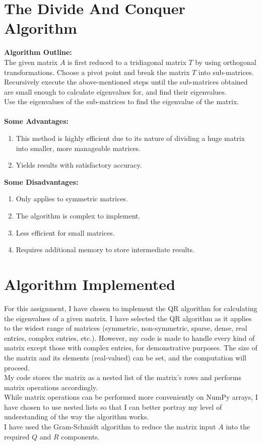 \documentclass[journal,12pt,twocolumn]{IEEEtran}
\theoremstyle{remark}
\begin{document}
\section{The Divide And Conquer Algorithm}
\textbf{Algorithm Outline:}
\\
The given matrix $A$ is first reduced to a tridiagonal matrix $T$ by using orthogonal transformations. Choose a pivot point and break the matrix $T$ into sub-matrices. \\
Recursively execute the above-mentioned steps until the sub-matrices obtained are small enough to calculate eigenvalues for, and find their eigenvalues. \\
Use the eigenvalues of the sub-matrices to find the eigenvalue of the matrix.
\\ \\
\textbf{Some Advantages:}
\begin{enumerate}
\item This method is highly efficient due to its nature of dividing a huge matrix into smaller, more manageable matrices.
\item Yields results with satisfactory accuracy.
\end{enumerate}
\textbf{Some Disadvantages:}
\begin{enumerate}
\item Only applies to symmetric matrices.
\item The algorithm is complex to implement.
\item Less efficient for small matrices.
\item Requires additional memory to store intermediate results.
\end{enumerate}

\newpage

\section*{Algorithm Implemented}
For this assignment, I have chosen to implement the QR algorithm for calculating the eigenvalues of a given matrix. I have selected the QR algorithm as it applies to the widest range of matrices (symmetric, non-symmetric, sparse, dense, real entries, complex entries, etc.). However, my code is made to handle every kind of matrix except those with complex entries, for demonstrative purposes. The size of the matrix and its elements (real-valued) can be set, and the computation will proceed. \\
My code stores the matrix as a nested list of the matrix's rows and performs matrix operations accordingly. \\
While matrix operations can be performed more conveniently on NumPy arrays, I have chosen to use nested lists so that I can better portray my level of understanding of the way the algorithm works. \\
I have used the Gram-Schmidt algorithm to reduce the matrix input $A$ into the required $Q$ and $R$ components.
\end{document}
